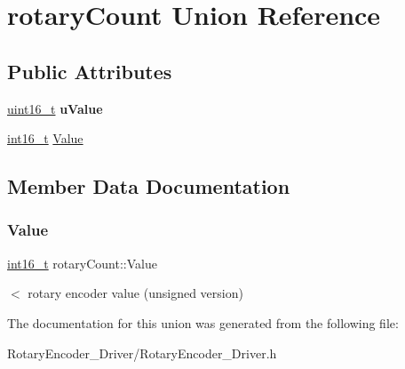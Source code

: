 \hypertarget{unionrotaryCount}{}\section{rotary\+Count Union Reference}
\label{unionrotaryCount}
\subsection*{Public Attributes}
\begin{DoxyCompactItemize}
\item 
\mbox{\label{unionrotaryCount_aadf1312766afa8c3eab9fcec0f282da6}} 
\hyperlink{vl53l0x__types_8h_a273cf69d639a59973b6019625df33e30}{uint16\+\_\+t} {\bfseries u\+Value}
\item 
\hyperlink{vl53l0x__types_8h_aa343fa3b3d06292b959ffdd4c4703b06}{int16\+\_\+t} \hyperlink{unionrotaryCount_a301b81bbc021fd083cd74a49d6594ba1}{Value}
\end{DoxyCompactItemize}


\subsection{Member Data Documentation}
\mbox{\label{unionrotaryCount_a301b81bbc021fd083cd74a49d6594ba1}} 
\subsubsection{\texorpdfstring{Value}{Value}}
{\footnotesize\ttfamily \hyperlink{vl53l0x__types_8h_aa343fa3b3d06292b959ffdd4c4703b06}{int16\+\_\+t} rotary\+Count\+::\+Value}

$<$ rotary encoder value (unsigned version) 

The documentation for this union was generated from the following file\+:\begin{DoxyCompactItemize}
\item 
Rotary\+Encoder\+\_\+\+Driver/Rotary\+Encoder\+\_\+\+Driver.\+h\end{DoxyCompactItemize}
